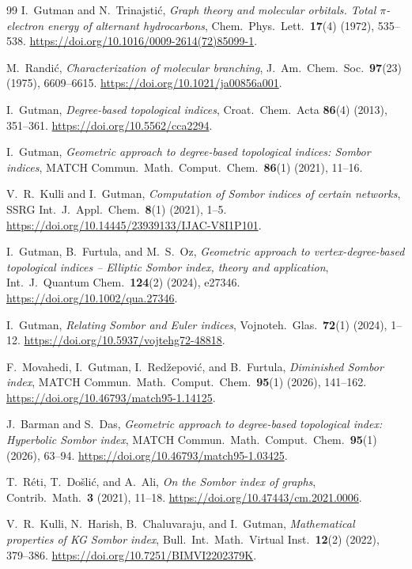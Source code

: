 \documentclass[11pt,a4paper]{article}
\theoremstyle{definition}
\begin{document}
\begin{thebibliography}{99}
I.~Gutman and N.~Trinajsti\'c,
\emph{Graph theory and molecular orbitals. Total $\pi$-electron energy of alternant hydrocarbons},
Chem.~Phys.~Lett.~\textbf{17}(4) (1972), 535--538.
\url{https://doi.org/10.1016/0009-2614(72)85099-1}.

M.~Randi\'c,
\emph{Characterization of molecular branching},
J.~Am.~Chem.~Soc.~\textbf{97}(23) (1975), 6609--6615.
\url{https://doi.org/10.1021/ja00856a001}.

I.~Gutman,
\emph{Degree-based topological indices},
Croat.~Chem.~Acta \textbf{86}(4) (2013), 351--361.
\url{https://doi.org/10.5562/cca2294}.

I.~Gutman,
\emph{Geometric approach to degree-based topological indices: Sombor indices},
MATCH Commun.~Math.~Comput.~Chem.~\textbf{86}(1) (2021), 11--16.

V.~R.~Kulli and I.~Gutman,
\emph{Computation of {Sombor} indices of certain networks},
SSRG Int.~J.~Appl.~Chem.~\textbf{8}(1) (2021), 1--5.
\url{https://doi.org/10.14445/23939133/IJAC-V8I1P101}.

I.~Gutman, B.~Furtula, and M.~S.~Oz,
\emph{Geometric approach to vertex-degree-based topological indices -- Elliptic Sombor index, theory and application},
Int.~J.~Quantum Chem.~\textbf{124}(2) (2024), e27346.
\url{https://doi.org/10.1002/qua.27346}.

I.~Gutman,
\emph{Relating {Sombor} and {Euler} indices},
Vojnoteh.~Glas.~\textbf{72}(1) (2024), 1--12.
\url{https://doi.org/10.5937/vojtehg72-48818}.

F.~Movahedi, I.~Gutman, I.~Red\v{z}epovi\'c, and B.~Furtula,
\emph{Diminished {Sombor} index},
MATCH Commun.~Math.~Comput.~Chem.~\textbf{95}(1) (2026), 141--162.
\url{https://doi.org/10.46793/match95-1.14125}.

J.~Barman and S.~Das,
\emph{Geometric approach to degree-based topological index: Hyperbolic {Sombor} index},
MATCH Commun.~Math.~Comput.~Chem.~\textbf{95}(1) (2026), 63--94.
\url{https://doi.org/10.46793/match95-1.03425}.

T.~R\'eti, T.~Do\v{s}li\'c, and A.~Ali,
\emph{On the {Sombor} index of graphs},
Contrib.~Math.~\textbf{3} (2021), 11--18.
\url{https://doi.org/10.47443/cm.2021.0006}.

V.~R.~Kulli, N.~Harish, B.~Chaluvaraju, and I.~Gutman,
\emph{Mathematical properties of {KG Sombor} index},
Bull.~Int.~Math.~Virtual Inst.~\textbf{12}(2) (2022), 379--386.
\url{https://doi.org/10.7251/BIMVI2202379K}.


\end{thebibliography}
\end{document}
